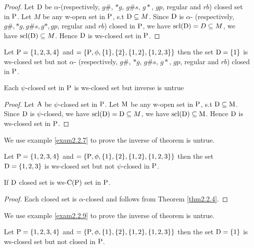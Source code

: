 \begin{proof}
Let $\mathrm{D}$ be $\alpha$-(respectively, $g\#$, $*g$, $g\# s$, $g*$, $gp$, regular and $rb$) closed set in $\mathrm{P}$. Let $M$ be any w-open set in $\mathrm{P}$, s.t $\mathrm{D} \subseteq M$. Since $\mathrm{D}$ is $\alpha$- (respectively, $g\#, *g, g\# s, g*,gp$, regular and $rb$) closed in $\mathrm{P}$, we have $\mathrm{scl}(\mathrm{D}) = D \subseteq M$, we have $\mathrm{scl}(\mathrm{D}) \subseteq M$. Hence $\mathrm{D}$ is ws-closed set in $\mathrm{P}$.
\end{proof}

\begin{exm}\label{exam2.2.5}
Let $\mathrm{P}= \{1, 2, 3, 4\}$ and $=\{\mathrm{P}, \phi, \{1\}, \{2\},\{1, 2\}, \{1, 2, 3\}\}$ then the set $\mathrm{D}=\{1\}$ is ws-closed set but not $\alpha$- (respectively, $g\#$, $*g$, $g\# s$, $g*$, $gp$, regular and $rb$) closed in $\mathrm{P}$.
\end{exm}

\begin{thm}\label{thm2.2.6}
Each $\psi$-closed set in $\mathrm{P}$ is ws-closed set but inverse is untrue
\end{thm}

\begin{proof}
Let $\mathrm{A}$ be $\psi$-closed set in $\mathrm{P}$. Let $\mathrm{M}$ be any w-open set in $\mathrm{P}$, s.t $\mathrm{D}\subseteq \mathrm{M}$. Since $\mathrm{D}$ is $\psi$-closed, we have $\mathrm{scl}(\mathrm{D})=\mathrm{D}\subseteq M$, we have $\mathrm{scl}(\mathrm{D})\subseteq \mathrm{M}$. Hence $\mathrm{D}$ is ws-closed set in $\mathrm{P}$.
\end{proof}

We use example \ref{exam2.2.7} to prove the inverse of theorem is untrue.

\begin{exm}\label{exam2.2.7}
Let $\mathrm{P}= \{1, 2, 3, 4\}$ and  $= \{\mathrm{P}, \phi, \{1\}, \{2\},\{1, 2\}, \{1, 2, 3\}\}$ then the set $\mathrm{D}= \{1,2,3\}$ is ws-closed set but not $\psi$-closed in $\mathrm{P}$.
\end{exm}

\begin{coro}\label{coro2.2.8}
If $\mathrm{D}$ closed set is ws-$\mathrm{C}(\mathrm{P})$ set in $\mathrm{P}$.
\end{coro}

\begin{proof}
Each closed set is $\alpha$-closed and follows from Theorem \ref{thm2.2.4}.
\end{proof}

We use example \ref{exam2.2.9} to prove the inverse of theorem is untrue. 

\begin{exm}\label{exam2.2.9}
Let $\mathrm{P}= \{1, 2, 3, 4\}$ and  $= \{\mathrm{P}, \phi, \{1\}, \{2\}, \{1, 2\}, \{1, 2, 3\}\}$ then the set $\mathrm{D} = \{1\}$ is ws-closed set but not closed in $\mathrm{P}$.
\end{exm}

